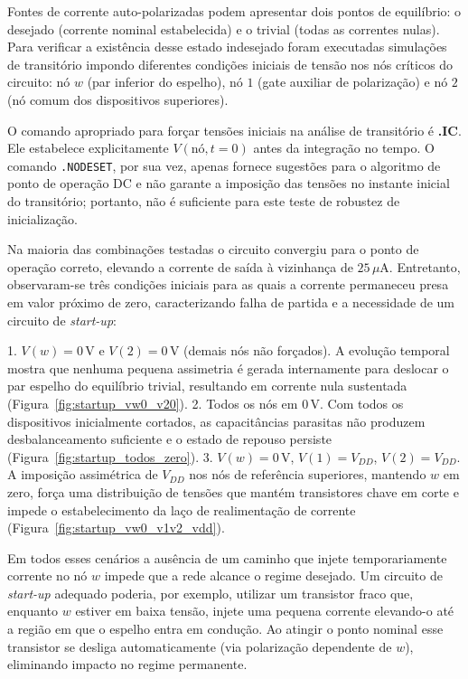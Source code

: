 \documentclass[12pt,a4paper]{article}
\begin{document}
Fontes de corrente auto-polarizadas podem apresentar dois pontos de equilíbrio: o desejado (corrente nominal estabelecida) e o trivial (todas as correntes nulas). Para verificar a existência desse estado indesejado foram executadas simulações de transitório impondo diferentes condições iniciais de tensão nos nós críticos do circuito: nó $w$ (par inferior do espelho), nó $1$ (gate auxiliar de polarização) e nó $2$ (nó comum dos dispositivos superiores). 

O comando apropriado para forçar tensões iniciais na análise de transitório é \textbf{.IC}. Ele estabelece explicitamente $V(\text{nó}, t=0)$ antes da integração no tempo. O comando \texttt{.NODESET}, por sua vez, apenas fornece sugestões para o algoritmo de ponto de operação DC e não garante a imposição das tensões no instante inicial do transitório; portanto, não é suficiente para este teste de robustez de inicialização.

Na maioria das combinações testadas o circuito convergiu para o ponto de operação correto, elevando a corrente de saída à vizinhança de $25\,\mu\text{A}$. Entretanto, observaram-se três condições iniciais para as quais a corrente permaneceu presa em valor próximo de zero, caracterizando falha de partida e a necessidade de um circuito de \emph{start-up}:

1. $V(w)=0\,$V e $V(2)=0\,$V (demais nós não forçados). A evolução temporal mostra que nenhuma pequena assimetria é gerada internamente para deslocar o par espelho do equilíbrio trivial, resultando em corrente nula sustentada (Figura~\ref{fig:startup_vw0_v20}).
2. Todos os nós em $0\,$V. Com todos os dispositivos inicialmente cortados, as capacitâncias parasitas não produzem desbalanceamento suficiente e o estado de repouso persiste (Figura~\ref{fig:startup_todos_zero}).
3. $V(w)=0\,$V, $V(1)=V_{DD}$, $V(2)=V_{DD}$. A imposição assimétrica de $V_{DD}$ nos nós de referência superiores, mantendo $w$ em zero, força uma distribuição de tensões que mantém transistores chave em corte e impede o estabelecimento da laço de realimentação de corrente (Figura~\ref{fig:startup_vw0_v1v2_vdd}).

Em todos esses cenários a ausência de um caminho que injete temporariamente corrente no nó $w$ impede que a rede alcance o regime desejado. Um circuito de \emph{start-up} adequado poderia, por exemplo, utilizar um transistor fraco que, enquanto $w$ estiver em baixa tensão, injete uma pequena corrente elevando-o até a região em que o espelho entra em condução. Ao atingir o ponto nominal esse transistor se desliga automaticamente (via polarização dependente de $w$), eliminando impacto no regime permanente.
\end{document}
